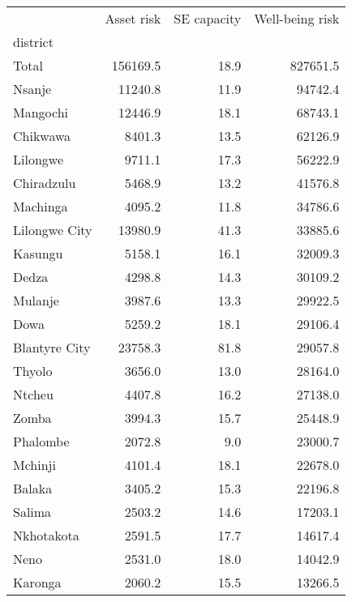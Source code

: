 \begin{tabular}{lrrr}
\toprule
{} &  Asset risk &  SE capacity &  Well-being risk \\
district      &             &              &                  \\
\midrule
Total         &    156169.5 &         18.9 &         827651.5 \\
Nsanje        &     11240.8 &         11.9 &          94742.4 \\
Mangochi      &     12446.9 &         18.1 &          68743.1 \\
Chikwawa      &      8401.3 &         13.5 &          62126.9 \\
Lilongwe      &      9711.1 &         17.3 &          56222.9 \\
Chiradzulu    &      5468.9 &         13.2 &          41576.8 \\
Machinga      &      4095.2 &         11.8 &          34786.6 \\
Lilongwe City &     13980.9 &         41.3 &          33885.6 \\
Kasungu       &      5158.1 &         16.1 &          32009.3 \\
Dedza         &      4298.8 &         14.3 &          30109.2 \\
Mulanje       &      3987.6 &         13.3 &          29922.5 \\
Dowa          &      5259.2 &         18.1 &          29106.4 \\
Blantyre City &     23758.3 &         81.8 &          29057.8 \\
Thyolo        &      3656.0 &         13.0 &          28164.0 \\
Ntcheu        &      4407.8 &         16.2 &          27138.0 \\
Zomba         &      3994.3 &         15.7 &          25448.9 \\
Phalombe      &      2072.8 &          9.0 &          23000.7 \\
Mchinji       &      4101.4 &         18.1 &          22678.0 \\
Balaka        &      3405.2 &         15.3 &          22196.8 \\
Salima        &      2503.2 &         14.6 &          17203.1 \\
Nkhotakota    &      2591.5 &         17.7 &          14617.4 \\
Neno          &      2531.0 &         18.0 &          14042.9 \\
Karonga       &      2060.2 &         15.5 &          13266.5 \\

\end{tabular}
